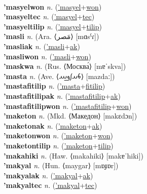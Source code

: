  \label{'masyelak} \\
\textbf{'masyelwon} \textit{n.} (\hyperref['masyel]{'masyel}+\hyperref[won]{won})
 \label{'masyelwon} \\
\textbf{'masyeltec} \textit{n.} (\hyperref['masyel]{'masyel}+\hyperref[tec]{tec})
 \label{'masyeltec} \\
\textbf{'masyeltilip} \textit{n.} (\hyperref['masyel]{'masyel}+\hyperref[tilip]{tilip})
 \label{'masyeltilip} \\
\textbf{'masli} \textit{n.} (Ara. ⟨مَصر⟩ [mɑsˁɾ])
 \label{'masli} \\
\textbf{'masliak} \textit{n.} (\hyperref['masli]{'masli}+\hyperref[ak]{ak})
 \label{'masliak} \\
\textbf{'masliwon} \textit{n.} (\hyperref['masli]{'masli}+\hyperref[won]{won})
 \label{'masliwon} \\
\textbf{'maskwa} \textit{n.} (Rus. ⟨Москва́⟩ [mɐˈskva])
 \label{'maskwa} \\
\textbf{'masta} \textit{n.} (Ave. ⟨𐬨𐬀𐬰𐬛𐬁⟩ [mazdaː])
 \label{'masta} \\
\textbf{'mastafitilip} \textit{n.} (\hyperref['masta]{'masta}+\hyperref[fitilip]{fitilip})
 \label{'mastafitilip} \\
\textbf{'mastafitilipak} \textit{n.} (\hyperref['mastafitilip]{'mastafitilip}+\hyperref[ak]{ak})
 \label{'mastafitilipak} \\
\textbf{'mastafitilipwon} \textit{n.} (\hyperref['mastafitilip]{'mastafitilip}+\hyperref[won]{won})
 \label{'mastafitilipwon} \\
\textbf{'maketon} \textit{n.} (Mkd. ⟨Македон⟩ [makɛdɔn])
 \label{'maketon} \\
\textbf{'maketonak} \textit{n.} (\hyperref['maketon]{'maketon}+\hyperref[ak]{ak})
 \label{'maketonak} \\
\textbf{'maketonwon} \textit{n.} (\hyperref['maketon]{'maketon}+\hyperref[won]{won})
 \label{'maketonwon} \\
\textbf{'maketontilip} \textit{n.} (\hyperref['maketon]{'maketon}+\hyperref[tilip]{tilip})
 \label{'maketontilip} \\
\textbf{'makahiki} \textit{n.} (Haw. ⟨makahiki⟩ [makɐˈhiki])
 \label{'makahiki} \\
\textbf{'makyal} \textit{n.} (Hun. ⟨maygar⟩ [mɒɟɒr])
 \label{'makyal} \\
\textbf{'makyalak} \textit{n.} (\hyperref['makyal]{'makyal}+\hyperref[ak]{ak})
 \label{'makyalak} \\
\textbf{'makyaltec} \textit{n.} (\hyperref['makyal]{'makyal}+\hyperref[tec]{tec})
